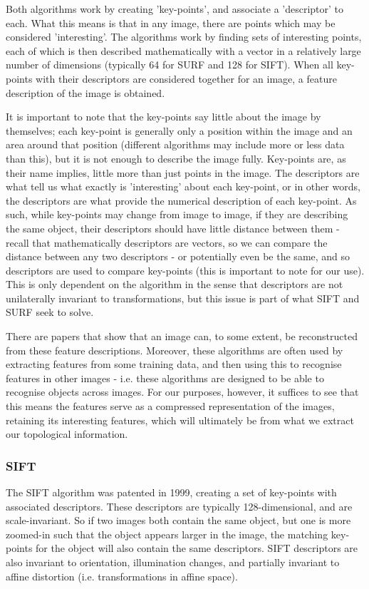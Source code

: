 \documentclass[a4paper]{article}
\begin{document}
Both algorithms work by creating 'key-points', and associate a 'descriptor' to each. What this means is that in any image, there are points which may be considered 'interesting'. The algorithms work by finding sets of interesting points, each of which is then described mathematically with a vector in a relatively large number of dimensions (typically 64 for SURF and 128 for SIFT). When all key-points with their descriptors are considered together for an image, a feature description of the image is obtained.

It is important to note that the key-points say little about the image by themselves; each key-point is generally only a position within the image and an area around that position (different algorithms may include more or less data than this), but it is not enough to describe the image fully. Key-points are, as their name implies, little more than just points in the image. The descriptors are what tell us what exactly is 'interesting' about each key-point, or in other words, the descriptors are what provide the numerical description of each key-point. As such, while key-points may change from image to image, if they are describing the same object, their descriptors should have little distance between them - recall that mathematically descriptors are vectors, so we can compare the distance between any two descriptors - or potentially even be the same, and so descriptors are used to compare key-points (this is important to note for our use). This is only dependent on the algorithm in the sense that descriptors are not unilaterally invariant to transformations, but this issue is part of what SIFT and SURF seek to solve.

There are papers that show that an image can, to some extent, be reconstructed from these feature descriptions. Moreover, these algorithms are often used by extracting features from some training data, and then using this to recognise features in other images - i.e. these algorithms are designed to be able to recognise objects across images. For our purposes, however, it suffices to see that this means the features serve as a compressed representation of the images, retaining its interesting features, which will ultimately be from what we extract our topological information.

\subsubsection*{SIFT}
The SIFT algorithm was patented in 1999, creating a set of key-points with associated descriptors. These descriptors are typically 128-dimensional, and are scale-invariant. So if two images both contain the same object, but one is more zoomed-in such that the object appears larger in the image, the matching key-points for the object will also contain the same descriptors. SIFT descriptors are also invariant to orientation, illumination changes, and partially invariant to affine distortion (i.e. transformations in affine space).
\end{document}
